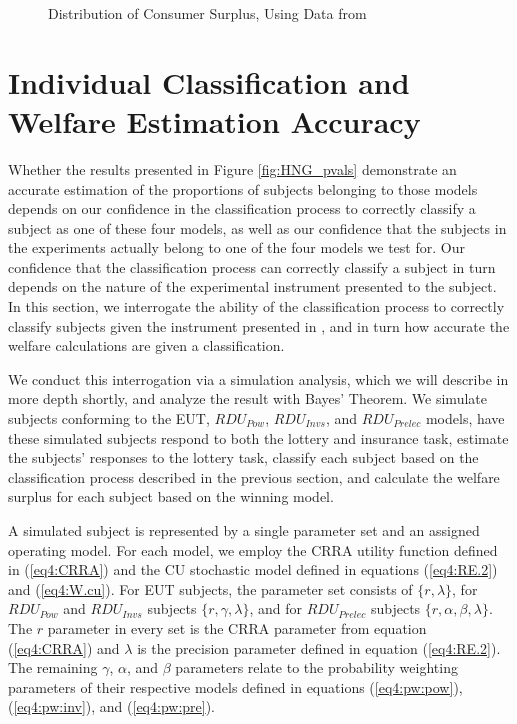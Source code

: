 \documentclass[../main.tex]{subfiles}
\begin{document}
\begin{figure}[h!]
	\center
	\caption{Distribution of Consumer Surplus, Using Data from \textcite{Harrison2016}}
	\label{fig:HNG_CS}
\end{figure}

\section{Individual Classification and Welfare Estimation Accuracy}

Whether the results presented in Figure \ref{fig:HNG_pvals} demonstrate an accurate estimation of the proportions of subjects belonging to those models depends on our confidence in the classification process to correctly classify a subject as one of these four models, as well as our confidence that the subjects in the experiments actually belong to one of the four models we test for.
Our confidence that the classification process can correctly classify a subject in turn depends on the nature of the experimental instrument presented to the subject.
In this section, we interrogate the ability of the classification process to correctly classify subjects given the instrument presented in \textcite{Harrison2016}, and in turn how accurate the welfare calculations are given a classification.

We conduct this interrogation via a simulation analysis, which we will describe in more depth shortly, and analyze the result with Bayes' Theorem.
We simulate subjects conforming to the EUT, $\mathit{RDU_{Pow}}$, $\mathit{RDU_{Invs}}$, and $\mathit{RDU_{Prelec}}$ models, have these simulated subjects respond to both the lottery and insurance task, estimate the subjects' responses to the lottery task, classify each subject based on the classification process described in the previous section, and calculate the welfare surplus for each subject based on the winning model.

A simulated subject is represented by a single parameter set and an assigned operating model.
For each model, we employ the CRRA utility function defined in (\ref{eq4:CRRA}) and the CU stochastic model defined in equations (\ref{eq4:RE.2}) and (\ref{eq4:W.cu}).
For EUT subjects, the parameter set consists of $\lbrace r, \lambda \rbrace$, for $\mathit{RDU_{Pow}}$ and $\mathit{RDU_{Invs}}$ subjects $\lbrace r, \gamma, \lambda \rbrace$, and for $\mathit{RDU_{Prelec}}$ subjects $\lbrace r, \alpha, \beta, \lambda \rbrace$.
The $r$ parameter in every set is the CRRA parameter from equation (\ref{eq4:CRRA}) and $\lambda$ is the precision parameter defined in equation (\ref{eq4:RE.2}).
The remaining $\gamma$, $\alpha$, and $\beta$ parameters relate to the probability weighting parameters of their respective models defined in equations (\ref{eq4:pw:pow}), (\ref{eq4:pw:inv}), and (\ref{eq4:pw:pre}).
\end{document}

